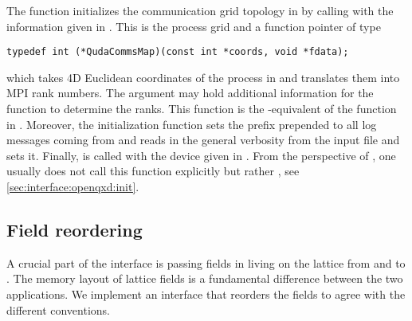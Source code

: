 The function initializes the communication grid topology in \quda by calling  with the information given in . This is the process grid and a function pointer of type
\begin{verbatim}
typedef int (*QudaCommsMap)(const int *coords, void *fdata);
\end{verbatim}
which takes 4D Euclidean coordinates of the process in \quda and translates them into MPI rank numbers.
The argument  may hold additional information for the function to determine the ranks.
This function is the \quda-equivalent of the function  in \openqxd.
Moreover, the initialization function sets the prefix prepended to all log messages coming from \quda and reads in the general verbosity from the input file and sets it.
Finally,  is called with the device given in .
From the perspective of \openqxd, one usually does not call this function explicitly but rather , see \cref{sec:interface:openqxd:init}.

\subsection{Field reordering}
\label{sec:interface:field_reordering}

A crucial part of the interface is passing fields in \openqxd living on the lattice from and to \quda.
The memory layout of lattice fields is a fundamental difference between the two applications.
We implement an interface that reorders the fields to agree with the different conventions.


